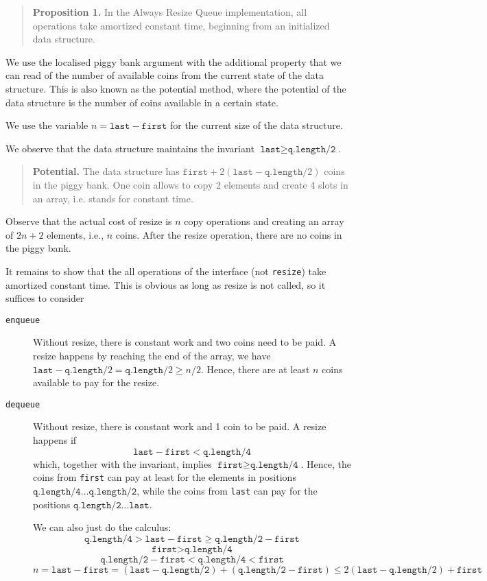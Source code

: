\documentclass{tufte-handout}
\begin{document}
\begin{quote}
  {\bf Proposition 1.} In the Always Resize Queue implementation, all operations take amortized constant time, beginning from an initialized data structure.
\end{quote}

We use the localised piggy bank argument with the additional property that we can read of the number of available coins from the current state of the data structure.
This is also known as the potential method, where the potential of the data structure is the number of coins available in a certain state.

We use the variable $n = \texttt{last} - \texttt{first}$ for the current size of the data structure.

We observe that the data structure maintains the invariant $\texttt{last} \geq \texttt{q.length/2}$. 
\begin{quote}
  {\bf Potential.} The data structure has $\texttt{first} + 2(\texttt{last} - \texttt{q.length}/2)$ coins in the piggy bank.
  One coin allows to copy 2 elements and create 4 slots in an array, i.e. stands for constant time.
\end{quote}

Observe that the actual cost of resize is $n$ copy operations and creating an array of $2n+2$ elements, i.e., $n$ coins.
After the resize operation, there are no coins in the piggy bank.

It remains to show that the all operations of the interface (not \texttt{resize}) take amortized constant time.
This is obvious as long as resize is not called, so it suffices to consider
\begin{description}
\item[\texttt{enqueue}]
  Without resize, there is constant work and two coins need to be paid.
  A resize happens by reaching the end of the array, we have $\texttt{last} - \texttt{q.length}/2 = \texttt{q.length}/2 \ge n/2$.
  Hence, there are at least $n$ coins available to pay for the resize.
\item[\texttt{dequeue}]
  Without resize, there is constant work and 1 coin to be paid.
  A resize happens if
  \[ \texttt{last} - \texttt{first} < \texttt{q.length/4} \]
  which, together with the invariant, implies $\texttt{first} \ge \texttt{q.length/4}$.
  Hence, the coins from \texttt{first} can pay at least for the elements in positions 
  $\texttt{q.length/4}\ldots \texttt{q.length/2}$, while the coins from \texttt{last} can pay for the positions   $\texttt{q.length/2}\ldots \texttt{last}$.

  \pagebreak
  We can also just do the calculus:
  \[ \texttt{q.length/4} > \texttt{last} - \texttt{first} \ge \texttt{q.length/2} - \texttt{first} \]
  \[  \texttt{first} >  \texttt{q.length/4} \]
  \[  \texttt{q.length/2} - \texttt{first} <  \texttt{q.length/4} < \texttt{first} \]
  \[ n = \texttt{last} - \texttt{first} = (\texttt{last} -\texttt{q.length/2}) + (\texttt{q.length/2} - \texttt{first}) \le  2(\texttt{last} - \texttt{q.length}/2) + \texttt{first}  \]
  
\end{description}
\end{document}
